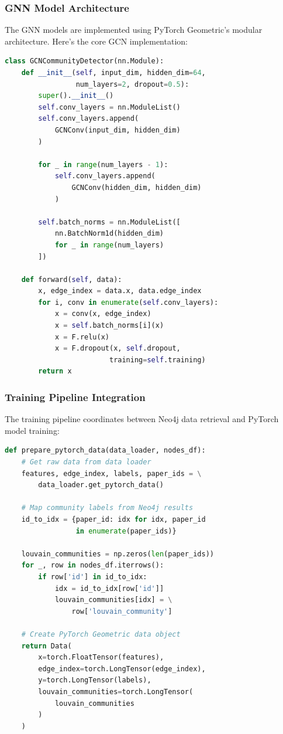 \documentclass[conference]{IEEEtran}
\begin{document}
\subsubsection{GNN Model Architecture}

The GNN models are implemented using PyTorch Geometric's modular architecture. Here's the core GCN implementation:

\begin{lstlisting}[language=Python, caption=Graph Convolutional Network Implementation]
class GCNCommunityDetector(nn.Module):
    def __init__(self, input_dim, hidden_dim=64, 
                 num_layers=2, dropout=0.5):
        super().__init__()
        self.conv_layers = nn.ModuleList()
        self.conv_layers.append(
            GCNConv(input_dim, hidden_dim)
        )
        
        for _ in range(num_layers - 1):
            self.conv_layers.append(
                GCNConv(hidden_dim, hidden_dim)
            )
        
        self.batch_norms = nn.ModuleList([
            nn.BatchNorm1d(hidden_dim) 
            for _ in range(num_layers)
        ])
    
    def forward(self, data):
        x, edge_index = data.x, data.edge_index
        for i, conv in enumerate(self.conv_layers):
            x = conv(x, edge_index)
            x = self.batch_norms[i](x)
            x = F.relu(x)
            x = F.dropout(x, self.dropout, 
                         training=self.training)
        return x
\end{lstlisting}

\subsubsection{Training Pipeline Integration}

The training pipeline coordinates between Neo4j data retrieval and PyTorch model training:

\begin{lstlisting}[language=Python, caption=Training Pipeline Integration]
def prepare_pytorch_data(data_loader, nodes_df):
    # Get raw data from data loader
    features, edge_index, labels, paper_ids = \
        data_loader.get_pytorch_data()
    
    # Map community labels from Neo4j results
    id_to_idx = {paper_id: idx for idx, paper_id 
                 in enumerate(paper_ids)}
    
    louvain_communities = np.zeros(len(paper_ids))
    for _, row in nodes_df.iterrows():
        if row['id'] in id_to_idx:
            idx = id_to_idx[row['id']]
            louvain_communities[idx] = \
                row['louvain_community']
    
    # Create PyTorch Geometric data object
    return Data(
        x=torch.FloatTensor(features),
        edge_index=torch.LongTensor(edge_index),
        y=torch.LongTensor(labels),
        louvain_communities=torch.LongTensor(
            louvain_communities
        )
    )
\end{lstlisting}
\end{document}
